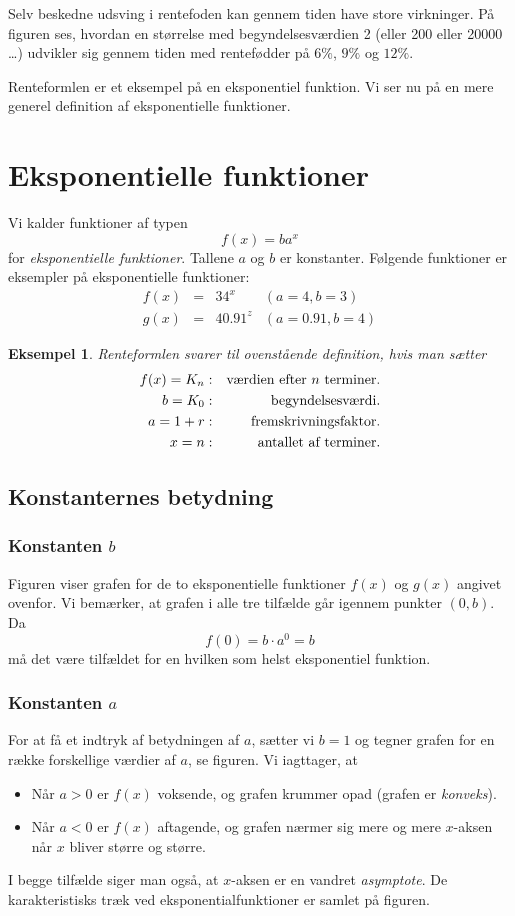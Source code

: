 \documentclass[12pt,oneside,a4paper]{article}
\newcommand{\bas}{\begin{eqnarray*}}
\newcommand{\eas}{\end{eqnarray*}}
\newtheorem{eks}[thm]{Eksempel}
\begin{document}
Selv beskedne udsving i rentefoden kan gennem tiden have store virkninger. På figuren
ses, hvordan en størrelse med begyndelsesværdien 2 (eller 200 eller 20000 \ldots) udvikler
sig gennem tiden med rentefødder på $6\%$, $9\%$ og $12\%$.

Renteformlen er et eksempel på en eksponentiel funktion. Vi ser nu på en mere generel
definition af eksponentielle funktioner.

\section{Eksponentielle funktioner}
Vi kalder funktioner af typen
$$
f(x) = ba^x
$$
for {\em eksponentielle funktioner}. Tallene $a$ og $b$ er konstanter. Følgende funktioner er 
eksempler på eksponentielle funktioner:
$$
\begin{array}{rcll}
    f(x) &=& 3 4^x & (a=4, b=3) \\
    g(x) &=& 4 0.91^z & (a=0.91, b=4) 
\end{array}
$$

\begin{eks}
    Renteformlen svarer til ovenstående definition, hvis man sætter
    \bas
    f(x) = K_n & : & \hbox{værdien efter $n$ terminer.} \\
       b = K_0 & : & \hbox{begyndelsesværdi.} \\
       a = 1+r & : & \hbox{fremskrivningsfaktor.} \\
       x = n   & : & \hbox{antallet af terminer.}
    \eas
\end{eks}

\subsection{Konstanternes betydning}
\subsubsection{Konstanten $b$}
Figuren viser grafen for de to eksponentielle funktioner $f(x)$ og $g(x)$
angivet ovenfor. Vi bemærker, at grafen i alle tre tilfælde går igennem punkter
$(0, b)$.  Da
$$
f(0) = b\cdot a^0 = b
$$
må det være tilfældet for en hvilken som helst eksponentiel funktion.

\subsubsection{Konstanten $a$}
For at få et indtryk af betydningen af $a$, sætter vi $b=1$ og tegner grafen
for en række forskellige værdier af $a$, se figuren. Vi iagttager, at 
\begin{itemize}
    \item Når $a>0$ er $f(x)$ voksende, og grafen krummer opad (grafen er {\em konveks}).
    \item Når $a<0$ er $f(x)$ aftagende, og grafen nærmer sig mere og mere
        $x$-aksen når $x$ bliver større og større.
\end{itemize}
I begge tilfælde siger man også, at $x$-aksen er en vandret {\em asymptote}.
De karakteristisks træk ved eksponentialfunktioner er samlet på figuren.
\end{document}
